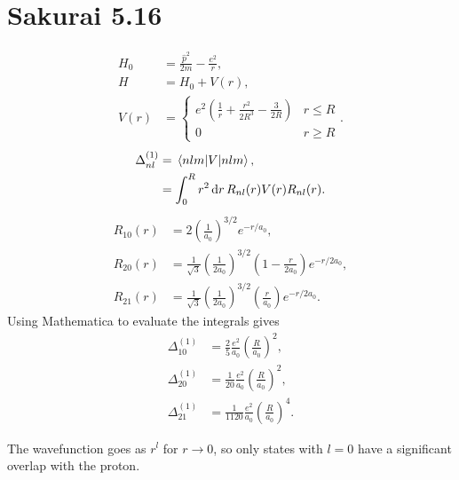 \documentclass[
a4paper,
10pt,
twoside,
]{article}
\begin{document}
\section{Sakurai 5.16}\label{sec: IV}
\begin{align}
	H_0 &= \frac{\hat{p}^2}{2m} - \frac{e^2}{r},\\
	H &= H_0 + V(r),\\
	V(r) &= \left\{
		\begin{array}{rl}
			e^2\left(\frac{1}{r}+\frac{r^2}{2R^3} - \frac{3}{2R}\right) & r \leq R \\
			0 & r \geq R
		\end{array}
	\right..
\end{align}
\begin{align}
	\Delta_{nl}^{(1)} &= \mel*{nlm}{V}{nlm},\\
	&= \int_0^R r^2\dd{r} R_{nl}(r) V(r) R_{nl}(r).
\end{align}
\begin{align}
	R_{10}(r) &= 2\left(\frac{1}{a_0}\right)^{3/2} e^{-r/a_0},\\
	R_{20}(r) &= \frac{1}{\sqrt{3}}\left(\frac{1}{2a_0}\right)^{3/2}\left(1-\frac{r}{2a_0}\right) e^{-r/2a_0},\\
	R_{21}(r) &= \frac{1}{\sqrt{3}}\left(\frac{1}{2a_0}\right)^{3/2}\left(\frac{r}{a_0}\right) e^{-r/2a_0}.
\end{align}
Using Mathematica to evaluate the integrals gives
\begin{align}
	\Delta_{10}^{(1)} &= \frac{2}{5} \frac{e^2}{a_0}\left(\frac{R}{a_0}\right)^2,\\
	\Delta_{20}^{(1)} &= \frac{1}{20} \frac{e^2}{a_0}\left(\frac{R}{a_0}\right)^2,\\
	\Delta_{21}^{(1)} &= \frac{1}{1120} \frac{e^2}{a_0}\left(\frac{R}{a_0}\right)^4.
\end{align}

The wavefunction goes as $r^l$ for $r\rightarrow 0$, so only states with $l=0$ have a significant overlap with the proton.

\stopmcols
\end{document}
